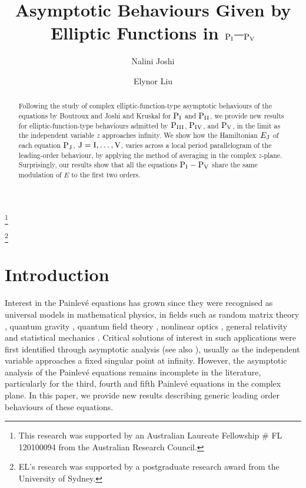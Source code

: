 \documentclass[a4paper,reqno]{amsart}
\theoremstyle{definition}
\theoremstyle{remark}
\theoremstyle{theorem}
\numberwithin{equation}{section}
\begin{document}
\title[Asymptotics of $\pI-\pV$]{Asymptotic Behaviours Given by Elliptic Functions in $\text{P$_{\text{I}}$}$--$\text{P$_{\text{V}}$}$}
\author{Nalini Joshi}
\address{School of Mathematics and Statistics F07, The University of Sydney, NSW 2006, Australia}
\thanks{This research was supported by an Australian Laureate Fellowship \# FL 120100094 from the Australian Research Council. }
\author{Elynor Liu}
\address{School of Mathematics and Statistics F07, The University of Sydney, NSW 2006 Australia}
\thanks{EL's research was supported by a postgraduate research award from the University of Sydney.}
\date{}

\begin{abstract}
Following the study of complex elliptic-function-type asymptotic behaviours of the \pv equations by Boutroux and Joshi and Kruskal for $\text{P$_{\text{I}}$}$ and $\text{P$_{\text{II}}$}$, we provide new results for elliptic-function-type behaviours admitted by $\text{P$_{\text{III}}$}$, $\text{P$_{\text{IV}}$}$, and $\text{P$_{\text{V}}$}$, in the limit as the independent variable $z$ approaches infinity. We show how the Hamiltonian $E_{\rm J}$ of each equation $\rm P_{\rm J}$, $\rm J=I, \ldots , V$, varies across a local period parallelogram of the leading-order behaviour, by applying the method of averaging in the complex $z$-plane. Surprisingly, our results show that all the equations $\pI-\pV$ share the same modulation of $E$ to the first two orders.
\end{abstract}
\maketitle

\section{Introduction}\label{sec:intro}
Interest in the Painlev\'e equations has grown since they were recognised as universal models in mathematical physics, in fields such as random matrix theory \cite{Deift2007, For2003, TW1994}, quantum gravity \cite{Gross1990a}, quantum field theory \cite{CTW1981}, nonlinear optics \cite{GJ1989}, general relativity \cite{Mac1983} and statistical mechanics \cite{Levi1992}. Critical solutions of interest in such applications were first identified through asymptotic analysis \cite{WMTB76,MTW77} (see also \cite{FIKN2006}), usually as the independent variable approaches a fixed singular point at infinity. However, the asymptotic analysis of the Painlev\'e equations remains incomplete in the literature, particularly for the third, fourth and fifth Painlev\'e equations in the complex plane. In this paper, we provide new results describing generic leading order behaviours of these equations.
\end{document}

